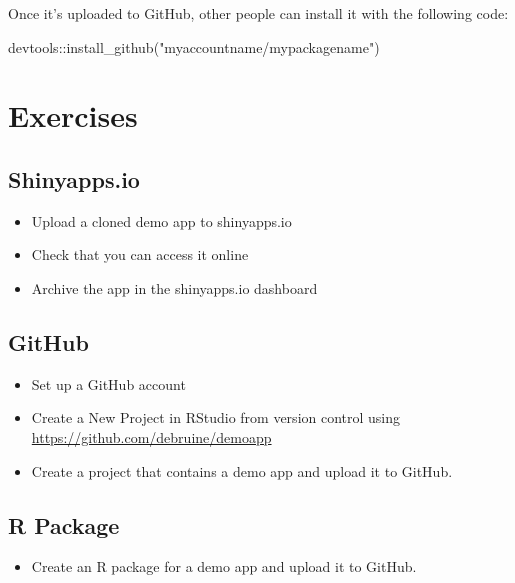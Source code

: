 \documentclass[
  oneside]{book}
\newenvironment{Shaded}{\begin{snugshade}}{\end{snugshade}}
\newcommand{\FunctionTok}[1]{\textcolor[rgb]{0.00,0.00,0.00}{#1}}
\newcommand{\NormalTok}[1]{#1}
\newcommand{\SpecialCharTok}[1]{\textcolor[rgb]{0.00,0.00,0.00}{#1}}
\newcommand{\StringTok}[1]{\textcolor[rgb]{0.31,0.60,0.02}{#1}}
\providecommand{\tightlist}{%
  \setlength{\itemsep}{0pt}\setlength{\parskip}{0pt}}
\begin{document}
Once it's uploaded to GitHub, other people can install it with the following code:

\begin{Shaded}
\begin{Highlighting}[]
\NormalTok{devtools}\SpecialCharTok{::}\FunctionTok{install\_github}\NormalTok{(}\StringTok{"myaccountname/mypackagename"}\NormalTok{)}
\end{Highlighting}
\end{Shaded}

\hypertarget{exercises-sharing}{%
\section{Exercises}\label{exercises-sharing}}

\hypertarget{shinyapps.io-1}{%
\subsection{Shinyapps.io}\label{shinyapps.io-1}}

\begin{itemize}
\tightlist
\item
  Upload a cloned demo app to shinyapps.io
\item
  Check that you can access it online
\item
  Archive the app in the shinyapps.io dashboard
\end{itemize}

\hypertarget{github-1}{%
\subsection{GitHub}\label{github-1}}

\begin{itemize}
\tightlist
\item
  Set up a GitHub account
\item
  Create a New Project in RStudio from version control using \url{https://github.com/debruine/demoapp}
\item
  Create a project that contains a demo app and upload it to GitHub.
\end{itemize}

\hypertarget{r-package}{%
\subsection{R Package}\label{r-package}}

\begin{itemize}
\tightlist
\item
  Create an R package for a demo app and upload it to GitHub.
\end{itemize}
\end{document}
